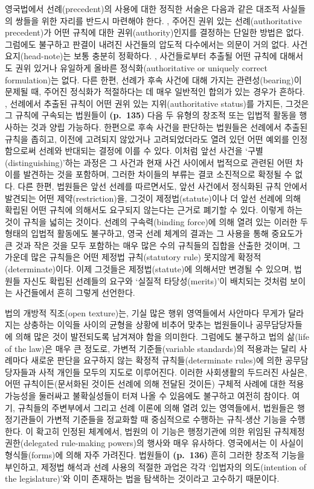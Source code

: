 영국법에서 선례(precedent)의 사용에 대한 정직한 서술은 다음과 같은
대조적 사실들의 쌍들을 위한 자리를 반드시 마련해야 한다. ,
주어진 권위 있는 선례(authoritative precedent)가 어떤 규칙에 대한
권위(authority)인지를 결정하는 단일한 방법은 없다. 그럼에도 불구하고
판결이 내려진 사건들의 압도적 다수에서는 의문이 거의 없다.
사건요지(head-note)는 보통 충분히 정확하다. , 사건들로부터
추출될 어떤 규칙에 대해서도 권위 있거나 유일하게 올바른
정식화(authoritative or uniquely correct formulation)는 없다. 다른 한편,
선례가 후속 사건에 대해 가지는 관련성(bearing)이 문제될 때, 주어진
정식화가 적절하다는 데 매우 일반적인 합의가 있는 경우가 흔하다.
, 선례에서 추출된 규칙이 어떤 권위 있는 지위(authoritative
status)를 가지든, 그것은 그 규칙에 구속되는 법원들이 \textbf{(p.~135)}
다음 두 유형의 창조적 또는 입법적 활동을 행사하는 것과 양립 가능하다.
한편으로 후속 사건을 판단하는 법원들은 선례에서 추출된 규칙을 좁히고,
이전에 고려되지 않았거나 고려되었더라도 열려 있던 어떤 예외를
인정함으로써 선례와 반대되는 결정에 이를 수 있다. 이처럼 앞선 사건을
‘구별(distinguishing)’하는 과정은 그 사건과 현재 사건 사이에서 법적으로
관련된 어떤 차이를 발견하는 것을 포함하며, 그러한 차이들의 부류는 결코
소진적으로 확정될 수 없다. 다른 한편, 법원들은 앞선 선례를 따르면서도,
앞선 사건에서 정식화된 규칙 안에서 발견되는 어떤 제약(restriction)을,
그것이 제정법(statute)이나 더 앞선 선례에 의해 확립된 어떤 규칙에
의해서도 요구되지 않는다는 근거로 폐기할 수 있다. 이렇게 하는 것이
규칙을 넓히는 것이다. 선례의 구속력(binding force)에 의해 열려 있는
이러한 두 형태의 입법적 활동에도 불구하고, 영국 선례 체계의 결과는 그
사용을 통해 중요도가 큰 것과 작은 것을 모두 포함하는 매우 많은 수의
규칙들의 집합을 산출한 것이며, 그 가운데 많은 규칙들은 어떤 제정법
규칙(statutory rule) 못지않게 확정적(determinate)이다. 이제 그것들은
제정법(statute)에 의해서만 변경될 수 있으며, 법원들 자신도 확립된
선례들의 요구와 ‘실질적 타당성(merits)’이 배치되는 것처럼 보이는
사건들에서 흔히 그렇게 선언한다.

법의 개방적 직조(open texture)는, 기실 많은 행위 영역들에서 사안마다
무게가 달라지는 상충하는 이익들 사이의 균형을 상황에 비추어 맞추는
법원들이나 공무담당자들에 의해 많은 것이 발전되도록 남겨져야 함을
의미한다. 그럼에도 불구하고 법의 삶(life of the law)은 매우 큰 정도로,
가변적 기준들(variable standards)의 적용과는 달리 사례마다 새로운 판단을
요구하지 않는 확정적 규칙들(determinate rules)에 의한 공무담당자들과
사적 개인들 모두의 지도로 이루어진다. 이러한 사회생활의 두드러진 사실은,
어떤 규칙이든(문서화된 것이든 선례에 의해 전달된 것이든) 구체적 사례에
대한 적용가능성을 둘러싸고 불확실성들이 터져 나올 수 있음에도 불구하고
여전히 참이다. 여기, 규칙들의 주변부에서 그리고 선례 이론에 의해 열려
있는 영역들에서, 법원들은 행정기관들이 가변적 기준들을 정교화할 때
중심적으로 수행하는 규칙-생산 기능을 수행한다. 이 확고히 인정된 체계에서, 법원의 이 기능은 행정기관에 의한
위임된 규칙제정 권한(delegated rule-making powers)의 행사와 매우
유사하다. 영국에서는 이 사실이 형식들(forms)에 의해 자주 가려진다.
법원들이 \textbf{(p.~136)} 흔히 그러한 창조적 기능을 부인하고, 제정법
해석과 선례 사용의 적절한 과업은 각각 ‘입법자의 의도(intention of the
legislature)’와 이미 존재하는 법을 탐색하는 것이라고 고수하기 때문이다.

